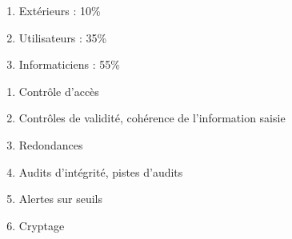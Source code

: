 \begin{enumerate}
	\item Extérieurs : 10\%
	\item Utilisateurs : 35\%
	\item Informaticiens : 55\%
\end{enumerate}

\begin{enumerate}
	\item Contrôle d'accès
	\item Contrôles de validité, cohérence de l'information saisie
	\item Redondances
	\item Audits d'intégrité, pistes d'audits
	\item Alertes sur seuils
	\item Cryptage
\end{enumerate}

